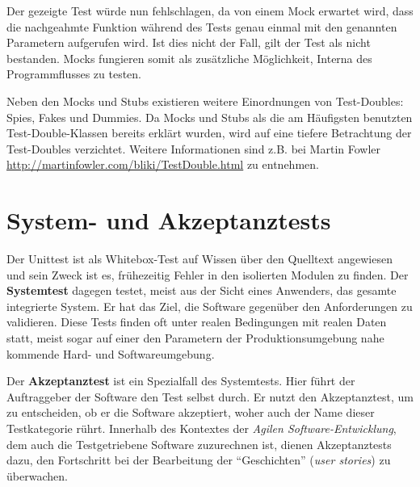   Der gezeigte Test würde nun fehlschlagen, da von einem Mock erwartet wird, dass die nachgeahmte Funktion während des Tests genau einmal mit den genannten Parametern aufgerufen wird. Ist dies nicht der Fall, gilt der Test als nicht bestanden. Mocks fungieren somit als zusätzliche Möglichkeit, Interna des Programmflusses zu testen.


  Neben den Mocks und Stubs existieren weitere Einordnungen von Test-Doubles: Spies, Fakes und Dummies. Da Mocks und Stubs als die am Häufigsten benutzten Test-Double-Klassen bereits erklärt wurden, wird auf eine tiefere Betrachtung der Test-Doubles verzichtet. Weitere Informationen sind z.B. bei Martin Fowler \url{http://martinfowler.com/bliki/TestDouble.html} zu entnehmen.

\section{System- und Akzeptanztests}
\label{sec:acceptance}
Der Unittest ist als Whitebox-Test auf Wissen über den Quelltext angewiesen und sein Zweck ist es, frühezeitig Fehler in den isolierten Modulen zu finden. Der \textbf{Systemtest} dagegen testet, meist aus der Sicht eines Anwenders, das gesamte integrierte System. Er hat das Ziel, die Software gegenüber den Anforderungen zu validieren. Diese Tests finden oft unter realen Bedingungen mit realen Daten statt, meist sogar auf einer den Parametern der Produktionsumgebung nahe kommende Hard- und Softwareumgebung.

Der \textbf{Akzeptanztest} ist ein Spezialfall des Systemtests. Hier führt der Auftraggeber der Software den Test selbst durch. Er nutzt den Akzeptanztest, um zu entscheiden, ob er die Software akzeptiert, woher auch der Name dieser Testkategorie rührt.
Innerhalb des Kontextes der \textit{Agilen Software-Entwicklung}, dem auch die Testgetriebene Software zuzurechnen ist, dienen Akzeptanztests dazu, den Fortschritt bei der Bearbeitung der "`Geschichten"' (\textit{user stories}) zu überwachen.

